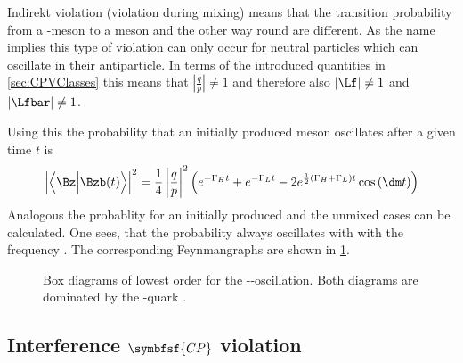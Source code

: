 Indirekt \CP violation (\CP violation during mixing) means that the transition probability from a \Bz-meson to a \Bzb meson
and the other way round are different. As the name implies this type of \CP violation can only occur for neutral particles
which can oscillate in their antiparticle. In terms of the introduced quantities in \cref{sec:CPVClasses} this means that
$\left|\frac{q}{p}\right|\neq1$ and therefore also $\left|\Lf\right|\neq1$ and $\left|\Lfbar\right|\neq1$.

Using this the probability that an initially produced
\Bz meson oscillates after a given time $t$ is
\begin{equation}
\left|\left<\Bz\Big|\Bzb\!\left(t\right)\right>\right|^2=\frac{1}{4}\left|\frac{q}{p}\right|^2
\left(e^{-\Gamma_Ht}+e^{-\Gamma_Lt}-2e^{\frac{1}{2}\left(\Gamma_H+\Gamma_L\right)t}\cos\left(\dm t\right)\right)
\end{equation}
Analogous the probablity for an initially produced \Bzb and the unmixed cases can be calculated. One sees, that the probability
always oscillates with with the frequency \dm. The corresponding Feynmangraphs are shown in \cref{fig:FeynmanMixing}.

\begin{figure}[tbp]
	\centering
	
	\hspace{0.5cm}
	
	\caption{Box diagrams of lowest order for the \Bz-\Bzb-oscillation. Both diagrams are dominated by the \tquark-quark \cite{Ellis:2016jkw}.}
	\label{fig:FeynmanMixing}
\end{figure}

\subsection[head={Interference \CP violation},tocentry={Interference \CP violation}]{Interference $\symbfsf{C{}P}$ violation}
\label{sec:InterferenceCPV}


